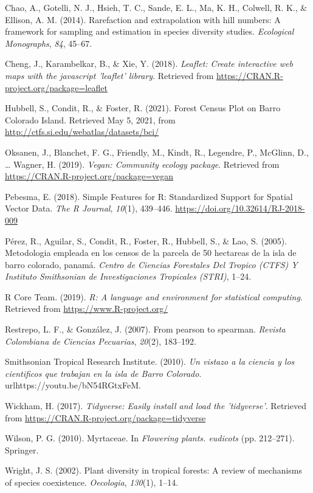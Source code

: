 \documentclass[11pt,]{article}
\begin{document}
\hypertarget{ref-paqueteiNEXT}{}
Chao, A., Gotelli, N. J., Hsieh, T. C., Sande, E. L., Ma, K. H.,
Colwell, R. K., \& Ellison, A. M. (2014). Rarefaction and extrapolation
with hill numbers: A framework for sampling and estimation in species
diversity studies. \emph{Ecological Monographs}, \emph{84}, 45--67.

\hypertarget{ref-leaflet}{}
Cheng, J., Karambelkar, B., \& Xie, Y. (2018). \emph{Leaflet: Create
interactive web maps with the javascript 'leaflet' library}. Retrieved
from \url{https://CRAN.R-project.org/package=leaflet}

\hypertarget{ref-webcenso}{}
Hubbell, S., Condit, R., \& Foster, R. (2021). Forest Census Plot on
Barro Colorado Island. Retrieved May 5, 2021, from
\url{http://ctfs.si.edu/webatlas/datasets/bci/}

\hypertarget{ref-vegan}{}
Oksanen, J., Blanchet, F. G., Friendly, M., Kindt, R., Legendre, P.,
McGlinn, D., \ldots{} Wagner, H. (2019). \emph{Vegan: Community ecology
package}. Retrieved from \url{https://CRAN.R-project.org/package=vegan}

\hypertarget{ref-sf}{}
Pebesma, E. (2018). Simple Features for R: Standardized Support for
Spatial Vector Data. \emph{The R Journal}, \emph{10}(1), 439--446.
\url{https://doi.org/10.32614/RJ-2018-009}

\hypertarget{ref-perez2005metodologia}{}
Pérez, R., Aguilar, S., Condit, R., Foster, R., Hubbell, S., \& Lao, S.
(2005). Metodologia empleada en los censos de la parcela de 50 hectareas
de la isla de barro colorado, panamá. \emph{Centro de Ciencias
Forestales Del Tropico (CTFS) Y Instituto Smithsonian de Investigaciones
Tropicales (STRI)}, 1--24.

\hypertarget{ref-citadeR}{}
R Core Team. (2019). \emph{R: A language and environment for statistical
computing}. Retrieved from \url{https://www.R-project.org/}

\hypertarget{ref-restrepo2007pearson}{}
Restrepo, L. F., \& González, J. (2007). From pearson to spearman.
\emph{Revista Colombiana de Ciencias Pecuarias}, \emph{20}(2), 183--192.

\hypertarget{ref-bci_video}{}
Smithsonian Tropical Research Institute. (2010). \emph{Un vistazo a la
ciencia y los cientificos que trabajan en la isla de Barro Colorado}.
urlhttps://youtu.be/bN54RGtxFeM.

\hypertarget{ref-tidyverse}{}
Wickham, H. (2017). \emph{Tidyverse: Easily install and load the
'tidyverse'}. Retrieved from
\url{https://CRAN.R-project.org/package=tidyverse}

\hypertarget{ref-wilson2010myrtaceae}{}
Wilson, P. G. (2010). Myrtaceae. In \emph{Flowering plants. eudicots}
(pp. 212--271). Springer.

\hypertarget{ref-wright2002plant}{}
Wright, J. S. (2002). Plant diversity in tropical forests: A review of
mechanisms of species coexistence. \emph{Oecologia}, \emph{130}(1),
1--14.




\newpage
\singlespacing 
\end{document}
